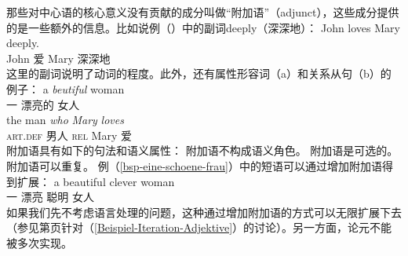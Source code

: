 那些对中心语的核心意义没有贡献的成分叫做“附加语”（adjunct），这些成分提供的是一些额外的信息。比如说例（）中的副词deeply（深深地）：
\ea
\gll John loves Mary deeply. \\
     John 爱 Mary 深深地 \\
\z
这里的副词说明了动词的程度。此外，还有属性形容词（a）和关系从句（b）的例子：
\eal
\ex\label{bsp-eine-schoene-frau}
\gll a {\em beutiful\/} woman\\
一 漂亮的 女人\\
\ex 
\gll the man {\em who\/} {\em Mary\/} {\em loves\/}\\
      \textsc{art}.\textsc{def}  男人 \textsc{rel} Mary  爱\\
\zl
附加语具有如下的句法和语义属性：
\eal
\label{adj-kriterien}
\ex 附加语不构成语义角色。
\ex 附加语是可选的。
\ex 附加语可以重复。
\zl
例（\ref{bsp-eine-schoene-frau}）中的短语可以通过增加附加语得到扩展：
\ea
\gll a beautiful clever woman \\
     一 漂亮 聪明 女人 \\
\z
如果我们先不考虑语言处理的问题，这种通过增加附加语的方式可以无限扩展下去（参见第\pageref{Beispiel-Iteration-Adjektive}页针对（\ref{Beispiel-Iteration-Adjektive}）的讨论）。另一方面，论元不能被多次实现。
